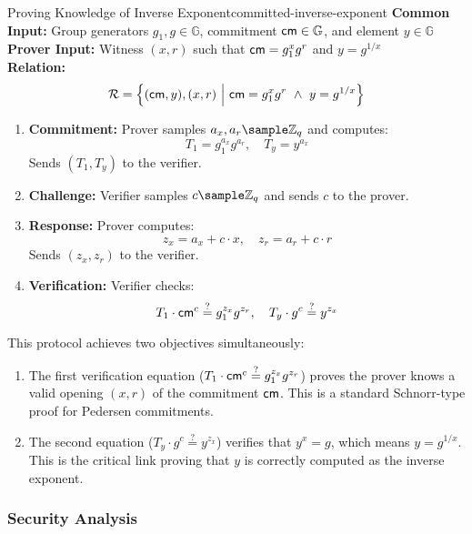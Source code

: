 \begin{protocol}{Proving Knowledge of Inverse Exponent}{committed-inverse-exponent}\label{pok-committed-inverse-exponent}
\textbf{Common Input:} Group generators $g_1, g \in \mathbb{G}$, commitment $\mathsf{cm} \in \mathbb{G}$, and element $y \in \mathbb{G}$ \\
\textbf{Prover Input:} Witness $(x, r)$ such that $\mathsf{cm} = g_1^x g^r$ and $y = g^{1/x}$ \\
\textbf{Relation:} 
\[
\mathcal{R} = \left\{ (\mathsf{cm}, y), (x, r) \ \middle|\ \mathsf{cm} = g_1^x g^r \ \land\ y = g^{1/x} \right\}
\]
\begin{enumerate}
    \item \textbf{Commitment:} Prover samples $a_x, a_r \sample \mathbb{Z}_q$ and computes:
    \[
    T_1 = g_1^{a_x} g^{a_r}, \quad T_y = y^{a_x}
    \]
    Sends $(T_1, T_y)$ to the verifier.

    \item \textbf{Challenge:} Verifier samples $c  \sample  \mathbb{Z}_q$ and sends $c$ to the prover.

    \item \textbf{Response:} Prover computes:
    \[
    z_x = a_x + c \cdot x, \quad z_r = a_r + c \cdot r
    \]
    Sends $(z_x, z_r)$ to the verifier.

    \item \textbf{Verification:} Verifier checks:
    \[
    T_1 \cdot \mathsf{cm}^c \stackrel{?}{=} g_1^{z_x} g^{z_r}, \quad T_y \cdot g^c \stackrel{?}{=} y^{z_x}
    \]
\end{enumerate}
\end{protocol}



This protocol achieves two objectives simultaneously:
\begin{enumerate}
    \item The first verification equation ($T_1 \cdot \mathsf{cm}^c \stackrel{?}{=} g_1^{z_x} g^{z_r}$) proves the prover knows a valid opening $(x, r)$ of the commitment $\mathsf{cm}$. This is a standard Schnorr-type proof for Pedersen commitments.
    
    \item The second equation ($T_y \cdot g^c \stackrel{?}{=} y^{z_x}$) verifies that $y^x = g$, which means $y = g^{1/x}$. This is the critical link proving that $y$ is correctly computed as the inverse exponent.
\end{enumerate}


\subsubsection{Security Analysis}


